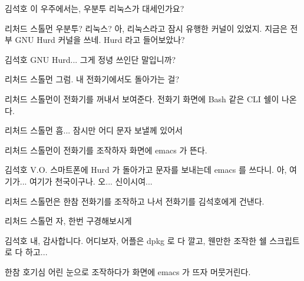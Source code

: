 \documentclass{screenplay}
\begin{document}
    \begin{dialogue}[한참 이것 저것 살펴보다가]{김석호}
        이 우주에서는, 우분투 리눅스가 대세인가요?
    \end{dialogue}
    \begin{dialogue}{리처드 스톨먼}
        우분투? 리눅스?
        아, 리눅스라고 잠시 유행한 커널이 있었지. 지금은 전부 GNU Hurd 커널을 쓰네. Hurd 라고 들어보았나?
    \end{dialogue}
    \begin{dialogue}[감격해 하며]{김석호}
        GNU Hurd... 그게 정녕 쓰인단 말입니까?
    \end{dialogue}
    \begin{dialogue}{리처드 스톨먼}
        그럼. 내 전화기에서도 돌아가는 걸?
    \end{dialogue}
    
    리처드 스톨먼이 전화기를 꺼내서 보여준다. 전화기 화면에 Bash 같은 CLI 쉘이 나온다.
    
    \begin{dialogue}{리처드 스톨먼}
        흠... 잠시만 어디 문자 보낼께 있어서
    \end{dialogue}
    
    
    리처드 스톨먼이 전화기를 조작하자 화면에 emacs 가 뜬다.
    
    \begin{dialogue}{김석호}
        V.O. 스마트폰에 Hurd 가 돌아가고 문자를 보내는데 emacs 를 쓰다니. 아, 여기가... 여기가 천국이구나. 오... 신이시여...
    \end{dialogue}
    
    
    리처드 스톨먼은 한참 전화기를 조작하고 나서 전화기를 김석호에게 건낸다.
    
    \begin{dialogue}{리처드 스톨먼}
        자, 한번 구경해보시게
    \end{dialogue}
    \begin{dialogue}{김석호}
        내, 감사합니다. 어디보자, 어플은 dpkg 로 다 깔고, 웬만한 조작한 쉘 스크립트로 다 하고...
    \end{dialogue}
    
    한참 호기심 어린 눈으로 조작하다가 화면에 emacs 가 뜨자 머뭇거린다.
    
\end{document}
